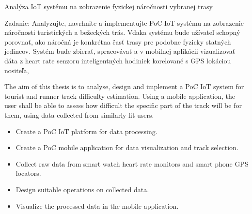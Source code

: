 \linebreak
Analýza IoT systému na zobrazenie fyzickej náročnosti vybranej trasy

Zadanie: Analyzujte, navrhnite a implementujte PoC IoT systému na zobrazenie náročnosti turistických a bežeckých trás. Vďaka systému bude užívateľ schopný porovnať, ako náročná je konkrétna časť trasy pre podobne fyzicky statných jedincov. Systém bude zbierať, spracovávať a v mobilnej aplikácii vizualizovať dáta z heart rate senzoru inteligentných hodiniek korelované s GPS lokáciou nositeľa, 


The aim of this thesis is to analyse, design and implement a PoC IoT system for tourist and runner track difficulty estimation.
Using a mobile application, the user shall be able to assess how difficult the specific part of the track will be for them, using data collected from similarly fit users.
\begin{itemize}
    \item Create a PoC IoT platform for data processing.
    \item Create a PoC mobile application for data visualization and track selection.
    \item Collect raw data from smart watch heart rate monitors and smart phone GPS locators.
    \item Design suitable operations on collected data.
    \item Visualize the processed data in the mobile application.
\end{itemize}